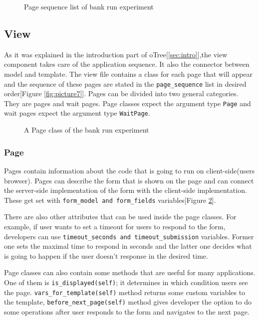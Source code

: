 \begin{figure}[h]
	\centerline{}
	\caption{Page sequence list of bank run experiment}
	\label{fig:picture9}
\end{figure}

\subsection{View}

As it was explained in the introduction part of oTree[\ref{sec:intro}],the view component takes care of the application sequence. It also the connector between model and template. The view file contains a class for each page that  will appear and the sequence of these pages are stated in the \verb|page_sequence| list in desired order[Figure \ref{fig:picture7}]. Pages can be divided into two general categories. They are pages and wait pages. Page classes expect the argument type \verb|Page| and wait pages expect the argument type \verb|WaitPage|.

\begin{figure}[h]
	\centerline{}
	\caption{A Page class of the bank run experiment}
	\label{fig:picture10}
\end{figure}

\subsubsection{Page}

Pages contain information about the code that is going to run on client-side(users browser). Pages can describe the form that is shown on the page and can connect the server-side implementation of the form with the client-side implementation. These get set with \verb|form_model and form_fields| variables[Figure \ref{fig:picture10}].

There are also other attributes that can be used inside the page classes. For example, if user wants to set a timeout for users to respond to the form, developers can use \verb|timeout_seconds and timeout_submission| variables. Former one sets the maximal time to respond in seconds and the latter one decides what is going to happen if the user doesn't response in the desired time.

Page classes can also contain some methods that are useful for many applications. One of them is \verb|is_displayed(self)|; it determines in which condition users see the page. \verb|vars_for_template(self)| method returns some custom variables to the template, \verb|before_next_page(self)| method gives developer the option to do some operations after user responds to the form and navigates to the next page.

